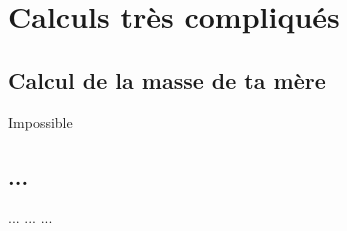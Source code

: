 
\chapter{Calculs très compliqués} %

\label{AppendixA} %

\section{Calcul de la masse de ta mère}

Impossible

\section{...}

... ... ...
